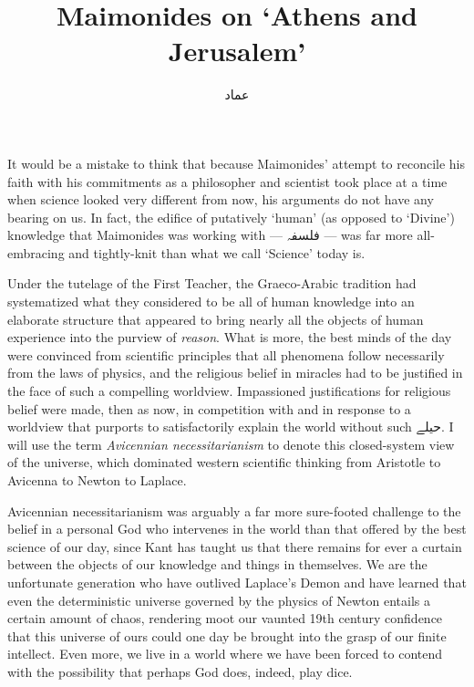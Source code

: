 \documentclass[12pt]{article}
\title{Maimonides on `Athens and Jerusalem'}
\author{\myfont عماد}
\begin{document}
\maketitle
It would be a mistake to think that because Maimonides' attempt to reconcile his faith with his commitments as a philosopher and scientist took place at a time when science looked very different from now, his arguments do not have any bearing on us. In fact, the edifice of putatively `human' (as opposed to `Divine') knowledge that Maimonides was working with --- {\myfont فلسفہ} --- was far more all-embracing and tightly-knit than what we call `Science' today is. 

Under the tutelage of the First Teacher, the Graeco-Arabic tradition had systematized what they considered to be all of human knowledge into an elaborate structure that appeared to bring nearly all the objects of human experience into the purview of \textit{reason}. What is more, the best minds of the day were convinced from scientific principles that all phenomena follow necessarily from the laws of physics, and the religious belief in miracles had to be justified in the face of such a compelling worldview. Impassioned justifications for religious belief were made, then as now, in competition with and in response to a worldview that purports to satisfactorily explain the world without such {\myfont حیلے}. I will use the term \emph{Avicennian necessitarianism} to denote this closed-system view of the universe, which dominated western scientific thinking from Aristotle to Avicenna to Newton to Laplace.

Avicennian necessitarianism was arguably a far more sure-footed challenge to the belief in a personal God who intervenes in the world than that offered by the best science of our day, since Kant has taught us that there remains for ever a curtain between the objects of our knowledge and things in themselves. We are the unfortunate generation who have outlived Laplace's Demon and have learned that even the deterministic universe governed by the physics of Newton entails a certain amount of chaos, rendering moot our vaunted 19th century confidence that this universe of ours could one day be brought into the grasp of our finite intellect.  Even more, we live in a world where we have been forced to contend with the possibility that perhaps God does, indeed, play dice.
\end{document}
